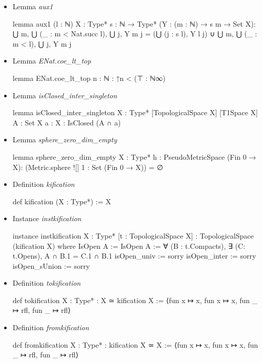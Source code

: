 \documentclass[colorinlistoftodos]{article}
\begin{document}
\begin{itemize}
  \item Lemma \emph{aux1}
\begin{leancode}
lemma aux1 (l : ℕ) {X : Type*} {s : ℕ →  Type*} (Y : (m : ℕ) → s m → Set X):
    ⋃ m, ⋃ (_ : m < Nat.succ l), ⋃ j, Y m j = 
    (⋃ (j : s l), Y l j) ∪ ⋃ m, ⋃ (_ : m < l), ⋃ j, Y m j
\end{leancode}
  \item Lemma \emph{ENat.coe\_lt\_top}
\begin{leancode}
lemma ENat.coe_lt_top {n : ℕ} : ↑n < (⊤ : ℕ∞)
\end{leancode}
  \item Lemma \emph{isClosed\_inter\_singleton}
\begin{leancode}
lemma isClosed_inter_singleton {X : Type*} [TopologicalSpace X] [T1Space X] {A : Set X} 
{a : X} : IsClosed (A ∩ {a})
\end{leancode}
  \item Lemma \emph{sphere\_zero\_dim\_empty}
\begin{leancode}
lemma sphere_zero_dim_empty {X : Type*} {h : PseudoMetricSpace (Fin 0 → X)}:
  (Metric.sphere ![] 1 : Set (Fin 0 → X)) = ∅
\end{leancode}
  \item Definition \emph{kification}
\begin{leancode}
def kification (X : Type*) := X
\end{leancode}
  \item Instance \emph{instkification}
\begin{leancode}
instance instkification {X : Type*} [t : TopologicalSpace X] : 
TopologicalSpace (kification X) where
  IsOpen A := IsOpen A := ∀ (B : t.Compacts), ∃ (C: t.Opens), A ∩ B.1 = C.1 ∩ B.1
  isOpen_univ := sorry
  isOpen_inter := sorry
  isOpen_sUnion := sorry
\end{leancode}
  \item Definition \emph{tokification}
\begin{leancode}
def tokification {X : Type*} : X ≃ kification X := 
⟨fun x ↦ x, fun x ↦ x, fun _ ↦ rfl, fun _ ↦ rfl⟩
\end{leancode}
  \item Definition \emph{fromkification}
\begin{leancode}
def fromkification {X : Type*} : kification X ≃ X := 
⟨fun x ↦ x, fun x ↦ x, fun _ ↦ rfl, fun _ ↦ rfl⟩
\end{leancode}
\end{itemize}
\end{document}
